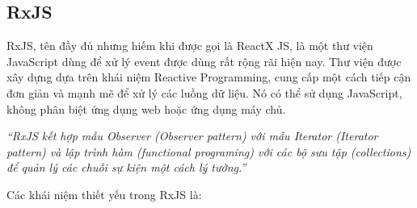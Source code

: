 \subsection{RxJS}

\tab RxJS, tên đầy đủ nhưng hiếm khi được gọi là ReactX JS, là một thư viện JavaScript dùng để xử lý event được dùng rất rộng rãi hiện nay.
Thư viện được xây dựng dựa trên khái niệm Reactive Programming, cung cấp một cách tiếp cận đơn giản và mạnh mẽ để xử lý các luồng dữ liệu.
Nó có thể sử dụng JavaScript, không phân biệt ứng dụng web hoặc ứng dụng máy chủ.
\par

\textit{“RxJS kết hợp mẫu Observer (Observer pattern) với mẫu Iterator (Iterator pattern) và lập trình hàm (functional programing) với các bộ sưu tập (collections) để quản lý các chuỗi sự kiện một cách lý tưởng.”} \cite{chap4bib5}
\par

Các khái niệm thiết yếu trong RxJS là: \cite{chap4bib5}

